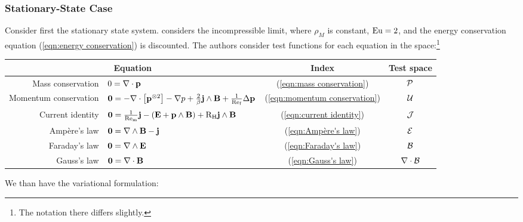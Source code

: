 \subsubsection*{Stationary-State Case}
    Consider first the stationary state system. \cite{LHF22} considers the incompressible limit, where $\rho_{M}$ is constant, $\mathrm{Eu}  =  2$, and the energy conservation equation (\ref{eqn:energy conservation}) is discounted. The authors consider test functions for each equation in the space:\footnote{The notation there differs slightly.}
    \begin{center}\begin{tabular}{ r l c | c }
        \multicolumn{2}{c}{Equation}  &  Index  &  Test space  \\
        \hline\hline
        Mass conservation  &  $0  =  \nabla\cdot\mathbf{p}$  &  (\ref{eqn:mass conservation})  &  $\mathcal{P}$  \\
        Momentum conservation  &  $\mathbf{0} 
         =  - \nabla\cdot\left[\mathbf{p}^{\otimes 2}\right] - \nabla p + \frac{2}{\beta}\mathbf{j}\wedge\mathbf{B} + \frac{1}{\mathrm{Re}_{\mathrm{f}}}\Delta\mathbf{p}$  &  (\ref{eqn:momentum conservation})  &  $\mathcal{U}$  \\
        \hline
        Current identity  &  $\mathbf{0}  =  \frac{1}{\mathrm{Re}_{\mathrm{m}}}\mathbf{j} - (\mathbf{E} + \mathbf{p}\wedge\mathbf{B}) + \mathrm{R}_{\mathrm{H}}\mathbf{j}\wedge\mathbf{B}$  &  (\ref{eqn:current identity})  &  $\mathcal{J}$  \\
        \hline
        Ampère's law  &  $\mathbf{0}  =  \nabla\wedge\mathbf{B} - \mathbf{j}$  &  (\ref{eqn:Ampère's law})  &  $\mathcal{E}$  \\
        Faraday's law  &  $\mathbf{0}  =  \nabla\wedge\mathbf{E}$  &  (\ref{eqn:Faraday's law})  &  $\mathcal{B}$  \\
        Gauss's law  &  $\mathbf{0}  =  \nabla\cdot\mathbf{B}$  &  (\ref{eqn:Gauss's law})  &  $\nabla\cdot\mathcal{B}$  \\
    \end{tabular}\end{center}
    We than have the variational formulation: 
